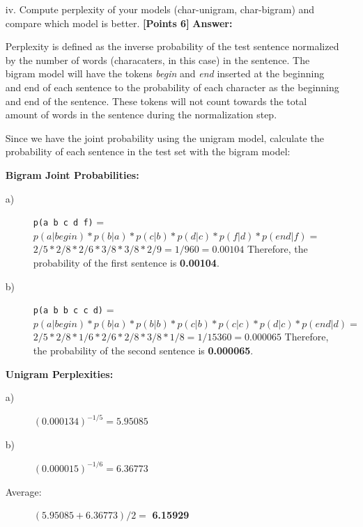 \documentclass[12pt]{article}
\newcommand\tab[1][1cm]{\hspace*{#1}}
\newcommand\n{\newline}
\begin{document}
\begin{enumerate}
\begin{enumerate}
                  \newpage
              \item[iv.] Compute perplexity of your models (char-unigram,
                  char-bigram) and compare which model is better.
                  \textbf{[Points 6]}
                  \n\textbf{Answer:}\n

                  \tab Perplexity is defined as the inverse probability of the
                  test sentence normalized by the number of words (characaters,
                  in this case) in the sentence. The bigram model will have the
                  tokens \textit{begin} and \textit{end} inserted at the
                  beginning and end of each sentence to the probability of each
                  character as the beginning and end of the sentence. These
                  tokens will not count towards the total amount of words in the
                  sentence during the normalization step.

                  Since we have the joint probability using the unigram model,
                  calculate the probability of each sentence in the test set
                  with the bigram model:\n

                  \textbf{Bigram Joint Probabilities:}
                  \begin{description}
                      \item[a)] \verb/p(a b c d f)/ = \n
                          $p(a|begin)*p(b|a)*p(c|b)*p(d|c)*p(f|d)*p(end|f) =$ \n
                          $2/5*2/8*2/6*3/8*3/8*2/9 = 1/960 = 0.00104$\n\n
                          Therefore, the probability of the first sentence is \textbf{0.00104}.
                      \item[b)] \verb/p(a b b c c d)/ = \n
                          $p(a|begin)*p(b|a)*p(b|b)*p(c|b)*p(c|c)*p(d|c)*p(end|d) =$ \n
                          $2/5*2/8*1/6*2/6*2/8*3/8*1/8 = 1/15360 = 0.000065$\n\n
                          Therefore, the probability of the second sentence is \textbf{0.000065}.
                  \end{description}

                  \textbf{Unigram Perplexities:}
                  \begin{description}
                      \item[a)] $(0.000134)^{-1/5} = 5.95085$
                      \item[b)] $(0.000015)^{-1/6} = 6.36773$
                      \item[Average:] $(5.95085 + 6.36773)/2 =$ \textbf{6.15929}
                  \end{description}


\end{enumerate}
\end{enumerate}
\end{document}
